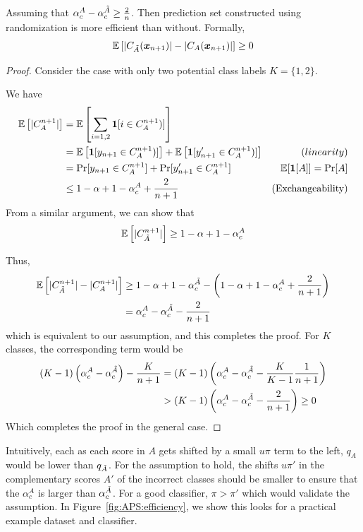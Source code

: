 \begin{theorem}
Assuming that $\alpha_c^A - \alpha_c^{\Tilde{A}} \geq \frac{2}{n}$. Then prediction set constructed using randomization is more efficient than without. Formally, 
\[
    \mathbb{E}\left[|C_{\Tilde{A}}({\bm{x}}_{n+1})| - |C_A({\bm{x}}_{n+1})|\right]  \geq 0
\]   
\label{them:APS:efficiency}
\end{theorem}
\begin{proof}
Consider the case with only two potential class labels $K = \{1, 2\}$. 

We have
\begin{align*}
    \mathbb{E}\left[|C_{A}^{n+1}|\right] &= \mathbb{E}\left[\sum\limits_{i=1, 2}\bm{1}[i \in C_{A}^{n+1})]\right] \\
                                 &= \mathbb{E}\left[\bm{1}[y_{n+1} \in C_{A}^{n+1})]\right] + \mathbb{E}\left[\bm{1}[y'_{n+1} \in C_{A}^{n+1})]\right]  & \text(linearity)\\
                                 &= \Pr[y_{n+1} \in C_{A}^{n+1}] + \Pr[y'_{n+1} \in C_{A}^{n+1}] & \text{$\mathbb{E}[\bm{1}[A]] = \Pr[A]$}\\
                                 &\leq 1 - \alpha + 1 - \alpha_c^A + \frac{2}{n+1} & \text{(Exchangeability)} 
\end{align*}
From a similar argument, we can show that 
\[
    \mathbb{E}\left[|C_{\Tilde{A}}^{n+1}|\right] \geq 1 - \alpha + 1 - \alpha_c^A
\]

Thus, 
\begin{align}
    \mathbb{E}\left[|C_{\Tilde{A}}^{n+1}| - |C_{A}^{n+1}|\right] &\geq 1 - \alpha + 1 - \alpha_c^{\Tilde{A}} - \left(1 - \alpha + 1 - \alpha_c^A + \frac{2}{n+1} \right)\\
    &= \alpha_c^A - \alpha_c^{\Tilde{A}} - \frac{2}{n+1}
\end{align}
which is equivalent to our assumption, and this completes the proof.
For $K$ classes, the corresponding term would be 
\begin{align*}
    (K-1)\left(\alpha_c^A - \alpha_c^{\Tilde{A}}\right) - \frac{K}{n+1} &= (K-1) \left(\alpha_c^A - \alpha_c^{\Tilde{A}} - \frac{K}{K-1} \frac{1}{n+1}\right)\\
    & >  (K-1)\left(\alpha_c^A - \alpha_c^{\Tilde{A}} - \frac{2}{n+1}\right) \geq 0
\end{align*}
Which completes the proof in the general case.

\end{proof}
Intuitively, each as each score in $A$ gets shifted by a small $u\pi$ term to the left, $q_A$ would be lower than $q_{\Tilde{A}}$.
For the assumption to hold, the shifts $u\pi'$ in the complementary scores $A'$ of the incorrect classes should be smaller to ensure that the $\alpha_c^A$ is larger than $\alpha_c^{\Tilde{A}}$.
For a good classifier, $\pi > \pi'$ which would validate the assumption. 
In Figure~\ref{fig:APS:efficiency}, we show this looks for a practical example dataset and classifier.

